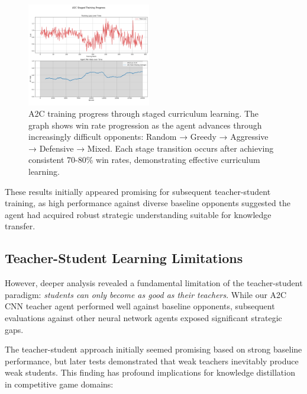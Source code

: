 \documentclass[conference]{IEEEtran}
\begin{document}
\begin{figure}[htbp]
\centering
\includegraphics[width=0.48\textwidth]{a2c_staged_training_progress.png}
\caption{A2C training progress through staged curriculum learning. The graph shows win rate progression as the agent advances through increasingly difficult opponents: Random → Greedy → Aggressive → Defensive → Mixed. Each stage transition occurs after achieving consistent 70-80\% win rates, demonstrating effective curriculum learning.}
\label{fig:a2c_curriculum_learning}
\end{figure}


These results initially appeared promising for subsequent teacher-student training, as high performance against diverse baseline opponents suggested the agent had acquired robust strategic understanding suitable for knowledge transfer.

\subsection{Teacher-Student Learning Limitations}

However, deeper analysis revealed a fundamental limitation of the teacher-student paradigm: \textit{students can only become as good as their teachers}. While our A2C CNN teacher agent performed well against baseline opponents, subsequent evaluations against other neural network agents exposed significant strategic gaps.

The teacher-student approach initially seemed promising based on strong baseline performance, but later tests demonstrated that weak teachers inevitably produce weak students. This finding has profound implications for knowledge distillation in competitive game domains:
\end{document}
